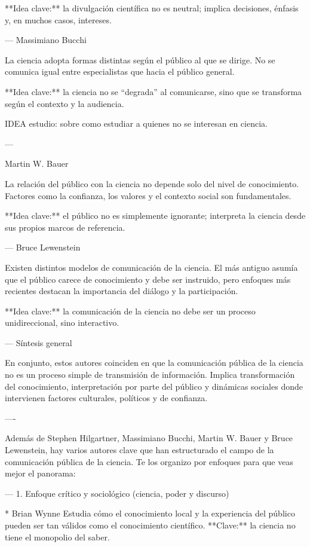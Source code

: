 \documentclass[11pt,                                                            
 superscriptaddress,twoside,
 amsmath,amssymb,
 aps, physrev
]{revtex4-2}
\begin{document}
**Idea clave:** la divulgación científica no es neutral; implica decisiones, énfasis y, en muchos casos, intereses.

---
Massimiano Bucchi

La ciencia adopta formas distintas según el público al que se dirige. No se comunica igual entre especialistas que hacia el público general.

**Idea clave:** la ciencia no se “degrada” al comunicarse, sino que se transforma según el contexto y la audiencia.

IDEA estudio: sobre como estudiar a quienes no se interesan en ciencia. 

---

Martin W. Bauer

La relación del público con la ciencia no depende solo del nivel de conocimiento. Factores como la confianza, los valores y el contexto social son fundamentales.

**Idea clave:** el público no es simplemente ignorante; interpreta la ciencia desde sus propios marcos de referencia.

---
Bruce Lewenstein

Existen distintos modelos de comunicación de la ciencia. El más antiguo asumía que el público carece de conocimiento y debe ser instruido, pero enfoques más recientes destacan la importancia del diálogo y la participación.

**Idea clave:** la comunicación de la ciencia no debe ser un proceso unidireccional, sino interactivo.

---
Síntesis general

En conjunto, estos autores coinciden en que la comunicación pública de la ciencia no es un proceso simple de transmisión de información. Implica transformación del conocimiento, interpretación por parte del público y dinámicas sociales donde intervienen factores culturales, políticos y de confianza.

----

Además de Stephen Hilgartner, Massimiano Bucchi, Martin W. Bauer y Bruce Lewenstein, hay varios autores clave que han estructurado el campo de la comunicación pública de la ciencia. Te los organizo por enfoques para que veas mejor el panorama:

---
1. Enfoque crítico y sociológico (ciencia, poder y discurso)

* Brian Wynne
Estudia cómo el conocimiento local y la experiencia del público pueden ser tan válidos como el conocimiento científico.
**Clave:** la ciencia no tiene el monopolio del saber.
\end{document}

